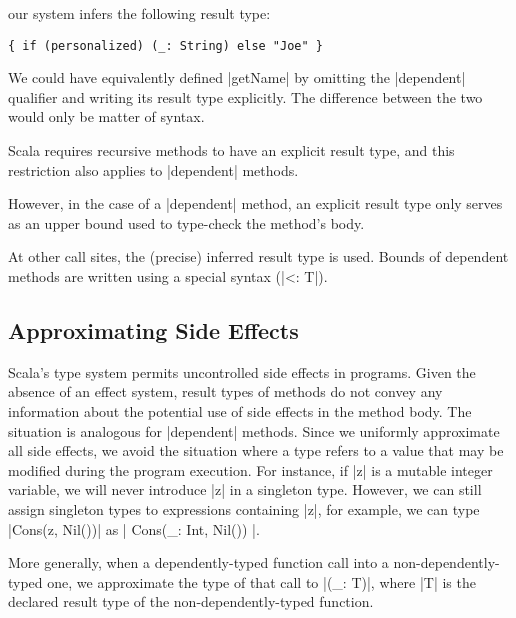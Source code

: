 \noindent
our system infers the following result type:

\begin{lstlisting}
{ if (personalized) (_: String) else "Joe" }
\end{lstlisting}

\noindent
We could have equivalently defined |getName| by omitting the |dependent| qualifier and writing its result type explicitly.
The difference between the two would only be matter of syntax.

Scala requires recursive methods to have an explicit result type, and this restriction also applies to |dependent| methods.
\begin{diff}
However, in the case of a |dependent| method, an explicit result type only serves as an upper bound used to type-check the method's body.
\end{diff}
At other call sites, the (precise) inferred result type is used.
Bounds of dependent methods are written using a special syntax (|<: T|).

\subsection{Approximating Side Effects}

Scala's type system permits uncontrolled side effects in programs.
Given the absence of an effect system, result types of methods do not convey any information about the potential use of side effects in the method body.
The situation is analogous for |dependent| methods.
Since we uniformly approximate all side effects, we avoid the situation where a type refers to a value that may be modified during the program execution.
For instance, if |z| is a mutable integer variable, we will never introduce |z| in a singleton type.
However, we can still assign singleton types to expressions containing |z|, for example, we can type |Cons(z, Nil())| as |{ Cons(_: Int, Nil()) }|.
\begin{diff}
More generally, when a dependently-typed function call into a non-dependently-typed one, we approximate the type of that call to |(_: T)|, where |T| is the  declared result type of the non-dependently-typed function.
\end{diff}

